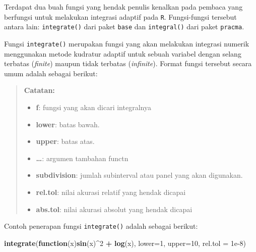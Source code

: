 \documentclass[]{book}
\newenvironment{Shaded}{\begin{snugshade}}{\end{snugshade}}
\newcommand{\ControlFlowTok}[1]{\textcolor[rgb]{0.13,0.29,0.53}{\textbf{#1}}}
\newcommand{\DataTypeTok}[1]{\textcolor[rgb]{0.13,0.29,0.53}{#1}}
\newcommand{\DecValTok}[1]{\textcolor[rgb]{0.00,0.00,0.81}{#1}}
\newcommand{\FloatTok}[1]{\textcolor[rgb]{0.00,0.00,0.81}{#1}}
\newcommand{\KeywordTok}[1]{\textcolor[rgb]{0.13,0.29,0.53}{\textbf{#1}}}
\newcommand{\NormalTok}[1]{#1}
\newcommand{\OperatorTok}[1]{\textcolor[rgb]{0.81,0.36,0.00}{\textbf{#1}}}
\newcommand{\StringTok}[1]{\textcolor[rgb]{0.31,0.60,0.02}{#1}}
\providecommand{\tightlist}{%
  \setlength{\itemsep}{0pt}\setlength{\parskip}{0pt}}
\theoremstyle{definition}
\theoremstyle{definition}
\theoremstyle{definition}
\theoremstyle{remark}
\begin{document}
Terdapat dua buah fungsi yang hendak penulis kenalkan pada pembaca yang berfungsi untuk melakukan integrasi adaptif pada \texttt{R}. Fungsi-fungsi tersebut antara lain: \texttt{integrate()} dari paket \texttt{base} dan \texttt{integral()} dari paket \texttt{pracma}.

Fungsi \texttt{integrate()} merupakan fungsi yang akan melakukan integrasi numerik menggunakan metode kudratur adaptif untuk sebuah variabel dengan selang terbatas (\emph{finite}) maupun tidak terbatas (\emph{infinite}). Format fungsi tersebut secara umum adalah sebagai berikut:

\begin{Shaded}
\end{Shaded}

\begin{quote}
\textbf{Catatan:}

\begin{itemize}
\tightlist
\item
  \textbf{f}: fungsi yang akan dicari integralnya
\item
  \textbf{lower}: batas bawah.
\item
  \textbf{upper}: batas atas.
\item
  \textbf{\ldots{}}: argumen tambahan functn
\item
  \textbf{subdivision}: jumlah subinterval atau panel yang akan digunakan.
\item
  \textbf{rel.tol}: nilai akurasi relatif yang hendak dicapai
\item
  \textbf{abs.tol}: nilai akurasi absolut yang hendak dicapai
\end{itemize}
\end{quote}

Contoh penerapan fungsi \texttt{integrate()} adalah sebagai berikut:

\begin{Shaded}
\begin{Highlighting}[]
\KeywordTok{integrate}\NormalTok{(}\ControlFlowTok{function}\NormalTok{(x)}\KeywordTok{sin}\NormalTok{(x)}\OperatorTok{^}\DecValTok{2} \OperatorTok{+}\StringTok{ }\KeywordTok{log}\NormalTok{(x),}
          \DataTypeTok{lower=}\DecValTok{1}\NormalTok{, }\DataTypeTok{upper=}\DecValTok{10}\NormalTok{,}
          \DataTypeTok{rel.tol =} \FloatTok{1e-8}\NormalTok{)}
\end{Highlighting}
\end{Shaded}
\end{document}
